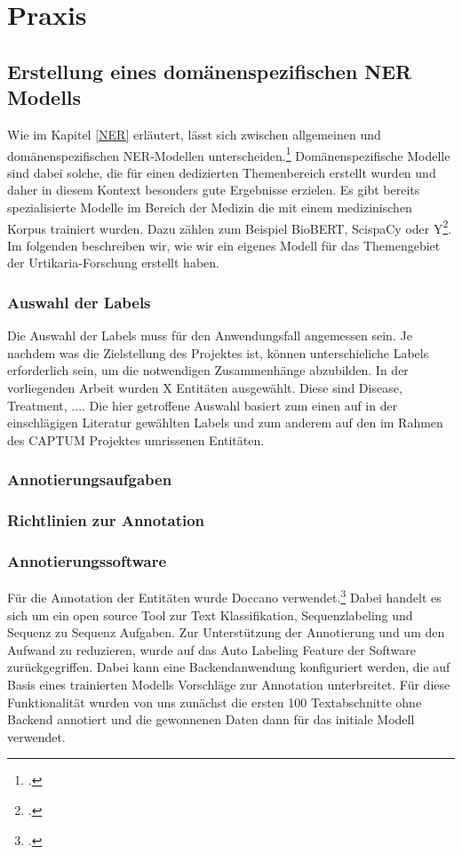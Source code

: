 \newpage
\section{Praxis} \label{latexDetails}
\subsection{Erstellung eines domänenspezifischen NER Modells}
Wie im Kapitel \ref{NER} erläutert, lässt sich zwischen allgemeinen und domänenspezifischen \ac{NER}-Modellen unterscheiden.\footcite[vgl.][S.47]{nouvel2016} Domänenspezifische Modelle sind dabei solche, die für einen dedizierten Themenbereich erstellt wurden und daher in diesem Kontext besonders gute Ergebnisse erzielen.
Es gibt bereits spezialisierte Modelle im Bereich der Medizin die mit einem medizinischen Korpus trainiert wurden. Dazu zählen zum Beispiel BioBERT, ScispaCy oder Y\footcite[S.12]{li2020}. Im folgenden beschreiben wir, wie wir ein eigenes Modell für das Themengebiet der Urtikaria-Forschung erstellt haben.

\subsubsection{Auswahl der Labels}
Die Auswahl der Labels muss für den Anwendungsfall angemessen sein. Je nachdem was die Zielstellung des Projektes ist, können unterschieliche Labels erforderlich sein, um die notwendigen Zusammenhänge abzubilden.
In der vorliegenden Arbeit wurden X Entitäten ausgewählt. Diese sind Disease, Treatment, .... Die hier getroffene Auswahl basiert zum einen auf in der einschlägigen Literatur gewählten Labels und zum anderem auf den im Rahmen des CAPTUM Projektes umrissenen Entitäten.

\subsubsection{Annotierungsaufgaben}

\subsubsection{Richtlinien zur Annotation}

\subsubsection{Annotierungssoftware}
Für die Annotation der Entitäten wurde Doccano verwendet.\footcite[vgl.][S.]{hirokinakayama2021} Dabei handelt es sich um ein open source Tool zur Text Klassifikation, Sequenzlabeling und Sequenz zu Sequenz Aufgaben.
Zur Unterstützung der Annotierung und um den Aufwand zu reduzieren, wurde auf das Auto Labeling Feature der Software zurückgegriffen. Dabei kann eine Backendanwendung konfiguriert werden, die auf Basis eines trainierten Modells Vorschläge zur Annotation unterbreitet.
Für diese Funktionalität wurden von uns zunächst die ersten 100 Textabschnitte ohne Backend annotiert und die gewonnenen Daten dann für das initiale Modell verwendet.

